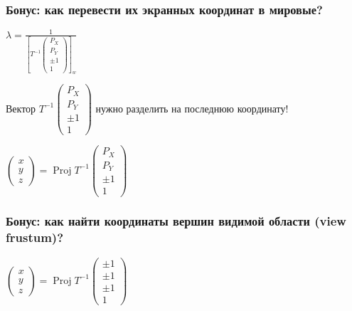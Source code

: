 \documentclass[10pt]{beamer}
\begin{document}
\begin{frame}[fragile]
\frametitle{Бонус: как перевести их экранных координат в мировые?}
\begin{center}
\begin{math}
\lambda =
\frac{1}{
\left[
T^{-1} \begin{pmatrix}P_X \\ P_Y \\ \pm 1 \\ 1\end{pmatrix}
\right]_w}
\end{math}
\end{center}
\pause
Вектор \begin{math}T^{-1}\begin{pmatrix}P_X \\ P_Y \\ \pm 1 \\ 1\end{pmatrix}\end{math} нужно разделить на последнюю координату!
\pause
\begin{center}
\begin{math}
\begin{pmatrix}x \\ y \\ z\end{pmatrix} =
\operatorname{Proj} T^{-1} \begin{pmatrix}P_X \\ P_Y \\ \pm 1 \\ 1\end{pmatrix}
\end{math}
\end{center}
\end{frame}

\begin{frame}[fragile]
\frametitle{Бонус: как найти координаты вершин видимой области (view frustum)?}
\begin{center}
\begin{math}
\begin{pmatrix}x \\ y \\ z\end{pmatrix} =
\operatorname{Proj} T^{-1} \begin{pmatrix}\pm 1 \\ \pm 1 \\ \pm 1 \\ 1\end{pmatrix}
\end{math}
\end{center}
\end{frame}
\end{document}
